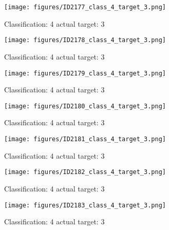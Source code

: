 \begin{figure}[h!]
\begin{center}
\texttt{[image: figures/ID2177\_class\_4\_target\_3.png]}
\end{center}
\caption{ Classification: 4 actual target: 3}
\label{fig:ID2177_class_4_target_3}
\end{figure}
\begin{figure}[h!]
\begin{center}
\texttt{[image: figures/ID2178\_class\_4\_target\_3.png]}
\end{center}
\caption{ Classification: 4 actual target: 3}
\label{fig:ID2178_class_4_target_3}
\end{figure}
\begin{figure}[h!]
\begin{center}
\texttt{[image: figures/ID2179\_class\_4\_target\_3.png]}
\end{center}
\caption{ Classification: 4 actual target: 3}
\label{fig:ID2179_class_4_target_3}
\end{figure}
\begin{figure}[h!]
\begin{center}
\texttt{[image: figures/ID2180\_class\_4\_target\_3.png]}
\end{center}
\caption{ Classification: 4 actual target: 3}
\label{fig:ID2180_class_4_target_3}
\end{figure}
\begin{figure}[h!]
\begin{center}
\texttt{[image: figures/ID2181\_class\_4\_target\_3.png]}
\end{center}
\caption{ Classification: 4 actual target: 3}
\label{fig:ID2181_class_4_target_3}
\end{figure}
\begin{figure}[h!]
\begin{center}
\texttt{[image: figures/ID2182\_class\_4\_target\_3.png]}
\end{center}
\caption{ Classification: 4 actual target: 3}
\label{fig:ID2182_class_4_target_3}
\end{figure}
\begin{figure}[h!]
\begin{center}
\texttt{[image: figures/ID2183\_class\_4\_target\_3.png]}
\end{center}
\caption{ Classification: 4 actual target: 3}
\label{fig:ID2183_class_4_target_3}
\end{figure}

